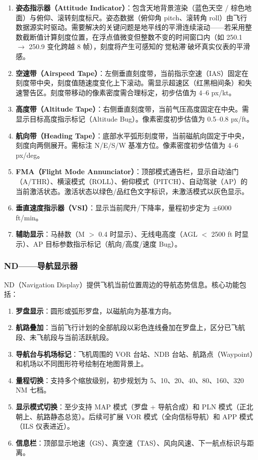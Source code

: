\documentclass[12pt,a4paper]{ctexart}
\begin{document}
\begin{enumerate}[leftmargin=*]
    \item \textbf{姿态指示器（Attitude Indicator）}：包含天地背景渲染（蓝色天空 / 棕色地面）与俯仰、滚转刻度标尺。姿态数据（俯仰角 pitch、滚转角 roll）由飞行数据源实时驱动。需要解决的关键问题是地平线的平滑连续滚动——若采用整数截断值计算刻度位置，在浮点值微变但整数不变的时间窗口内（如 250.1 $\rightarrow$ 250.9 变化跨越 8 帧），刻度将产生可感知的\"视觉粘滞\"，破坏真实仪表的平滑感。
    \item \textbf{空速带（Airspeed Tape）}：左侧垂直刻度带，当前指示空速（IAS）固定在刻度带中央，刻度值随速度变化上下滚动。需显示超速区（红黑相间条）和失速警告区。刻度带移动的像素密度需合理标定，初步估值为 4--6 px/kt。
    \item \textbf{高度带（Altitude Tape）}：右侧垂直刻度带，当前气压高度固定在中央。需显示目标高度指示标记（Altitude Bug）。像素密度初步估值为 0.5--0.8 px/ft。
    \item \textbf{航向带（Heading Tape）}：底部水平弧形刻度带，当前磁航向固定于中央，刻度向两侧展开。需标注 N/E/S/W 基准方位。像素密度初步估值为 4--6 px/deg。
    \item \textbf{FMA（Flight Mode Annunciator）}：顶部模式通告栏，显示自动油门（A/THR）、横滚模式（ROLL）、俯仰模式（PITCH）、自动驾驶（AP）的当前激活状态。激活状态以绿色/品红色文字标识，未激活模式以灰色显示。
    \item \textbf{垂直速度指示器（VSI）}：显示当前爬升/下降率，量程初步定为 $\pm 6000$ ft/min。
    \item \textbf{辅助显示}：马赫数（M $>$ 0.4 时显示）、无线电高度（AGL $<$ 2500 ft 时显示）、AP 目标参数指示标记（航向/高度/速度 Bug）。
\end{enumerate}

\subsubsection{ND——导航显示器}

ND（Navigation Display）提供飞机当前位置周边的导航态势信息。核心功能包括：

\begin{enumerate}[leftmargin=*]
    \item \textbf{罗盘显示}：圆形或弧形罗盘，以磁航向为基准方向。
    \item \textbf{航路叠加}：当前飞行计划的全部航段以彩色连线叠加在罗盘上，区分已飞航段、未飞航段与当前活跃航段。
    \item \textbf{导航台与机场标记}：飞机周围的 VOR 台站、NDB 台站、航路点（Waypoint）和机场以不同图形符号绘制在地图背景上。
    \item \textbf{量程切换}：支持多个缩放级别，初步规划为 5、10、20、40、80、160、320 NM 七档。
    \item \textbf{显示模式切换}：至少支持 MAP 模式（罗盘 + 导航合成）和 PLN 模式（正北朝上、航路静态总览）。后续可扩展 VOR 模式（全向信标导航）和 APP 模式（ILS 仪表进近）。
    \item \textbf{信息栏}：顶部显示地速（GS）、真空速（TAS）、风向风速、下一航点标识与距离。
\end{enumerate}
\end{document}

